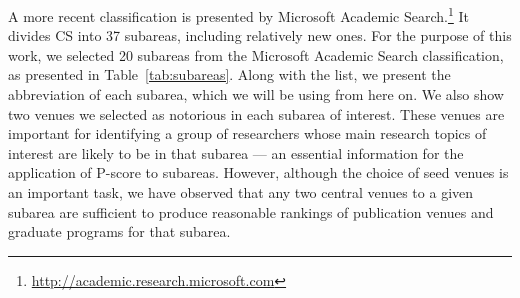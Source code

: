 \documentclass[msc]{ppgccufmg}
\begin{document}

A more recent classification is presented by Microsoft Academic Search.\footnote{\url{http://academic.research.microsoft.com}} It divides CS into 37 subareas, including relatively new ones. 
%
For the purpose of this work, we selected 20 subareas from the Microsoft Academic Search classification, as presented in Table~\ref{tab:subareas}. 
{\color{blue}
Along with the list, we present the abbreviation of each subarea, which we will be using from here on. We also show two venues we selected as notorious in each subarea of interest. These venues are important for identifying a group of researchers whose main research topics of interest are likely to be in that subarea --- an essential information for the application of P-score to subareas. However, although the choice of seed venues is an important task, we have observed that any two central venues to a given subarea are sufficient to produce reasonable rankings of publication venues and graduate programs for that subarea.    
}
\end{document}
